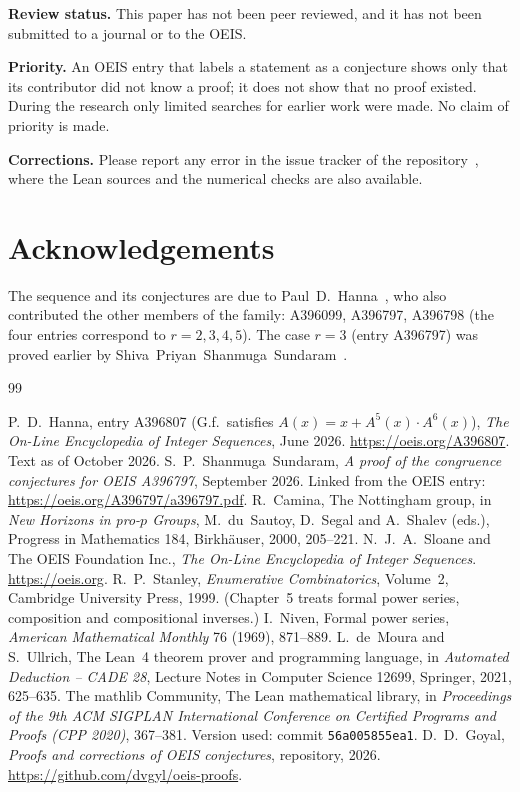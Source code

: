 \documentclass[11pt,a4paper]{article}
\theoremstyle{definition}
\theoremstyle{remark}
\newcommand{\para}[1]{\par\medskip\noindent\textbf{#1}\enspace}
\begin{document}
\para{Review status.} This paper has not been peer reviewed, and it has not been submitted to a journal or to the OEIS.

\para{Priority.} An OEIS entry that labels a statement as a conjecture shows only that its contributor did not know
a proof; it does not show that no proof existed. During the research only limited searches for earlier work were
made. No claim of priority is made.

\para{Corrections.} Please report any error in the issue tracker of the repository~\cite{repo}, where the Lean sources and the numerical checks are also
available.

\section*{Acknowledgements}
The sequence and its conjectures are due to Paul~D.~Hanna~\cite{oeis}, who also contributed the other members of the
family: A396099, A396797, A396798 (the four entries correspond to $r=2,3,4,5$). The case $r=3$ (entry A396797) was
proved earlier by Shiva~Priyan~Shanmuga~Sundaram~\cite{sundaram}. 

\begin{thebibliography}{99}\small
\raggedright
{} P.~D.~Hanna, entry A396807 (G.f.\ satisfies $A(x)=x+A^{5}(x)\cdot A^{6}(x)$), \emph{The On-Line Encyclopedia of Integer Sequences}, June 2026. \url{https://oeis.org/A396807}. Text as of October 2026.
 S.~P.~Shanmuga~Sundaram, \emph{A proof of the congruence conjectures for OEIS A396797}, September 2026. Linked from the OEIS entry: \url{https://oeis.org/A396797/a396797.pdf}.
 R.~Camina, The Nottingham group, in \emph{New Horizons in pro-$p$ Groups}, M.~du~Sautoy, D.~Segal and A.~Shalev (eds.), Progress in Mathematics 184, Birkh\"auser, 2000, 205--221.
 N.~J.~A.~Sloane and The OEIS Foundation Inc., \emph{The On-Line Encyclopedia of Integer Sequences}. \url{https://oeis.org}.
 R.~P.~Stanley, \emph{Enumerative Combinatorics}, Volume~2, Cambridge University Press, 1999. (Chapter~5 treats formal power series, composition and compositional inverses.)
 I.~Niven, Formal power series, \emph{American Mathematical Monthly} 76 (1969), 871--889.
 L.~de~Moura and S.~Ullrich, The Lean~4 theorem prover and programming language, in \emph{Automated Deduction -- CADE 28}, Lecture Notes in Computer Science 12699, Springer, 2021, 625--635.
 The mathlib Community, The Lean mathematical library, in \emph{Proceedings of the 9th ACM SIGPLAN International Conference on Certified Programs and Proofs (CPP 2020)}, 367--381. Version used: commit \texttt{56a005855ea1}.
 D.~D.~Goyal, \emph{Proofs and corrections of OEIS conjectures}, repository, 2026. \url{https://github.com/dvgyl/oeis-proofs}.
\end{thebibliography}
\end{document}
